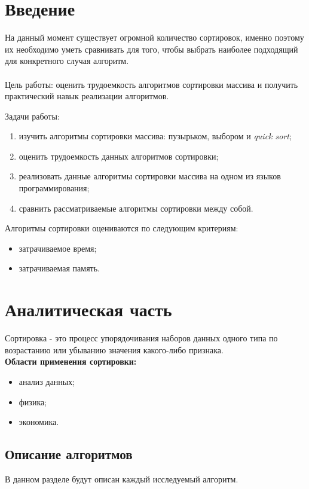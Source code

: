 \documentclass[12pt,a4paper]{article}
\numberwithin{equation}{section}
\begin{document}
\section*{\Huge Введение}
\qquad На данный момент существует огромной количество сортировок, именно поэтому их необходимо уметь сравнивать для того, чтобы выбрать наиболее подходящий для конкретного случая алгоритм.\\\\
{Цель работы:} оценить трудоемкость алгоритмов сортировки массива и получить практический навык реализации алгоритмов.\vspace{\baselineskip} 

{Задачи работы:}
\begin{enumerate}
	\item изучить алгоритмы сортировки массива: пузырьком, выбором и \textit{quick sort}; 
	\item оценить трудоемкость данных алгоритмов сортировки;
	\item реализовать данные алгоритмы сортировки массива на одном из языков программирования;  
	\item сравнить рассматриваемые алгоритмы сортировки между собой.
\end{enumerate}

\qquad Алгоритмы сортировки оцениваются по следующим критериям:
\begin{itemize}
	\item затрачиваемое время;
	\item затрачиваемая память.
\end{itemize}

\clearpage

\section{Аналитическая часть}
\qquad Сортировка - это процесс упорядочивания наборов данных одного типа по возрастанию или убыванию значения какого-либо признака.\\
\textbf{Области применения сортировки:} 
\begin{itemize}
	\item анализ данных;
	\item физика;
	\item экономика.
\end{itemize}

\subsection{Описание алгоритмов}
\qquad В данном разделе будут описан каждый исследуемый алгоритм.
\end{document}
